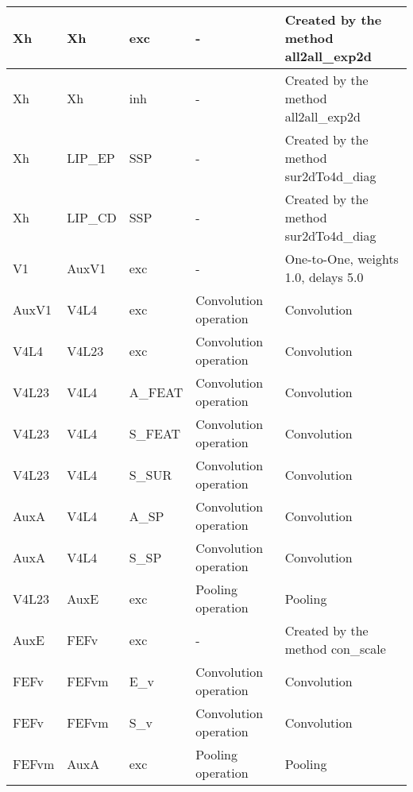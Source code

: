 \documentclass{article}
\begin{document}
\begin{xltabular}{\linewidth}{|l|l|l|X|X|}
    Xh & Xh & exc & - &
    Created by the method all2all\_exp2d \\ \hline

    Xh & Xh & inh & - &
    Created by the method all2all\_exp2d \\ \hline

    Xh & LIP\_EP & SSP & - &
    Created by the method sur2dTo4d\_diag \\ \hline

    Xh & LIP\_CD & SSP & - &
    Created by the method sur2dTo4d\_diag \\ \hline

    V1 & AuxV1 & exc & - &
    One-to-One, weights 1.0, delays 5.0 \\ \hline

    AuxV1 & V4L4 & exc & Convolution operation &
    Convolution \\ \hline

    V4L4 & V4L23 & exc & Convolution operation &
    Convolution \\ \hline

    V4L23 & V4L4 & A\_FEAT & Convolution operation &
    Convolution \\ \hline

    V4L23 & V4L4 & S\_FEAT & Convolution operation &
    Convolution \\ \hline

    V4L23 & V4L4 & S\_SUR & Convolution operation &
    Convolution \\ \hline

    AuxA & V4L4 & A\_SP & Convolution operation &
    Convolution \\ \hline

    AuxA & V4L4 & S\_SP & Convolution operation &
    Convolution \\ \hline

    V4L23 & AuxE & exc & Pooling operation &
    Pooling \\ \hline

    AuxE & FEFv & exc & - &
    Created by the method con\_scale \\ \hline

    FEFv & FEFvm & E\_v & Convolution operation &
    Convolution \\ \hline

    FEFv & FEFvm & S\_v & Convolution operation &
    Convolution \\ \hline

    FEFvm & AuxA & exc & Pooling operation &
    Pooling \\ \hline


\end{xltabular}
\end{document}
